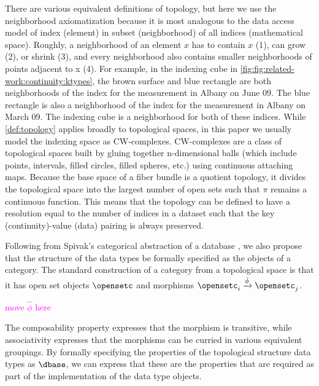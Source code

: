 \documentclass[review]{vgtc}
\newcommand{\note}[1]{\textcolor{magenta}{#1}}
\theoremstyle{definition}
\theoremstyle{remark}
\begin{document}
There are various equivalent definitions of topology, but here we use the neighborhood axiomatization because it is most analogous to the data access model of index (element) in subset (neighborhood) of all indices (mathematical space). Roughly, a neighborhood of an element $x$ has to contain $x$ (1), can grow (2), or shrink (3), and every neighborhood also contains smaller neighborhoods of points adjacent to x (4). For example, in the indexing cube in \autoref{fig:fig:related-work:continuity:ktypes}, the brown surface and blue rectangle are both neighborhoods of the index for the measurement in Albany on June 09. The blue rectangle is also a neighborhood of the index for the measurement in Albany on March 09. The indexing cube is a neighborhood for both of these indices. While \autoref{def:topology} applies broadly to topological spaces, in this paper we usually model the indexing space as CW-complexes. CW-complexes are a class of topological spaces built by gluing together n-dimensional balls (which include points, intervals, filled circles, filled spheres, etc.) using continuous attaching maps. Because the base space of a fiber bundle is a quotient topology\cite{munkresElementsAlgebraicTopology1984}, it divides the topological space into the largest number of open sets such that $\pi$ remains a continuous function. This means that the topology can be defined to have a resolution equal to the number of indices in a dataset such that the key (continuity)-value (data) pairing is always preserved.

Following from Spivak's categorical abstraction of a database \cite{spivakSimplicialDatabases2009,spivakDatabasesAreCategories2010}, we also propose that the structure of the data types be formally specified as the objects of a category. The standard construction of a category from a topological space is that it has open set objects $\opensetc$ and morphisms $\opensetc_i \xrightarrow{\hat{\phi}} \opensetc_j$\cite{riehlCategoryTheoryContext}.

\note{move $\hat{\phi}$ here}

The composability property expresses that the morphism is transitive, while associativity expresses that the morphisms can be curried in various equivalent groupings. By formally specifying the properties of the topological structure data types as $\mathcal{\dbase}$, we can express that these are the properties that are required as part of the implementation of the data type objects.
\end{document}
